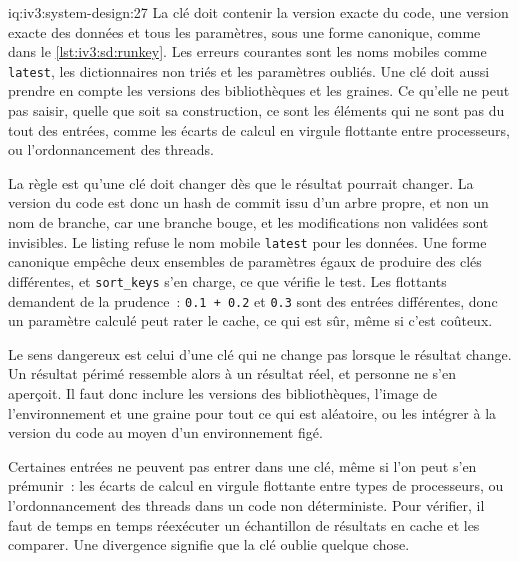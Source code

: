 \begin{solution}{iq:iv3:system-design:27}
La clé doit contenir la version exacte du code, une version exacte des données et tous les paramètres, sous une forme canonique, comme dans le \cref{lst:iv3:sd:runkey}. Les erreurs courantes sont les noms mobiles comme \texttt{latest}, les dictionnaires non triés et les paramètres oubliés. Une clé doit aussi prendre en compte les versions des bibliothèques et les graines. Ce qu'elle ne peut pas saisir, quelle que soit sa construction, ce sont les éléments qui ne sont pas du tout des entrées, comme les écarts de calcul en virgule flottante entre processeurs, ou l'ordonnancement des threads.
\label{lst:iv3:sd:runkey}

La règle est qu'une clé doit changer dès que le résultat pourrait changer. La version du code est donc un hash de commit issu d'un arbre propre, et non un nom de branche, car une branche bouge, et les modifications non validées sont invisibles. Le listing refuse le nom mobile \texttt{latest} pour les données. Une forme canonique empêche deux ensembles de paramètres égaux de produire des clés différentes, et \texttt{sort\_keys} s'en charge, ce que vérifie le test. Les flottants demandent de la prudence~: \texttt{0.1 + 0.2} et \texttt{0.3} sont des entrées différentes, donc un paramètre calculé peut rater le cache, ce qui est sûr, même si c'est coûteux.

Le sens dangereux est celui d'une clé qui ne change pas lorsque le résultat change. Un résultat périmé ressemble alors à un résultat réel, et personne ne s'en aperçoit. Il faut donc inclure les versions des bibliothèques, l'image de l'environnement et une graine pour tout ce qui est aléatoire, ou les intégrer à la version du code au moyen d'un environnement figé.

Certaines entrées ne peuvent pas entrer dans une clé, même si l'on peut s'en prémunir~: les écarts de calcul en virgule flottante entre types de processeurs, ou l'ordonnancement des threads dans un code non déterministe. Pour vérifier, il faut de temps en temps réexécuter un échantillon de résultats en cache et les comparer. Une divergence signifie que la clé oublie quelque chose.

\end{solution}

